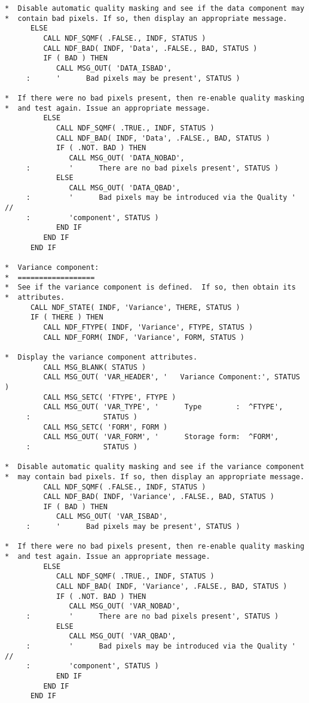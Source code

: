 \documentclass[twoside,11pt]{article}
\begin{document}
\begin{verbatim}
*  Disable automatic quality masking and see if the data component may
*  contain bad pixels. If so, then display an appropriate message.
      ELSE
         CALL NDF_SQMF( .FALSE., INDF, STATUS )
         CALL NDF_BAD( INDF, 'Data', .FALSE., BAD, STATUS )
         IF ( BAD ) THEN
            CALL MSG_OUT( 'DATA_ISBAD',
     :      '      Bad pixels may be present', STATUS )

*  If there were no bad pixels present, then re-enable quality masking
*  and test again. Issue an appropriate message.
         ELSE
            CALL NDF_SQMF( .TRUE., INDF, STATUS )
            CALL NDF_BAD( INDF, 'Data', .FALSE., BAD, STATUS )
            IF ( .NOT. BAD ) THEN
               CALL MSG_OUT( 'DATA_NOBAD',
     :         '      There are no bad pixels present', STATUS )
            ELSE
               CALL MSG_OUT( 'DATA_QBAD',
     :         '      Bad pixels may be introduced via the Quality ' //
     :         'component', STATUS )
            END IF
         END IF
      END IF

*  Variance component:
*  ==================
*  See if the variance component is defined.  If so, then obtain its
*  attributes.
      CALL NDF_STATE( INDF, 'Variance', THERE, STATUS )
      IF ( THERE ) THEN
         CALL NDF_FTYPE( INDF, 'Variance', FTYPE, STATUS )
         CALL NDF_FORM( INDF, 'Variance', FORM, STATUS )

*  Display the variance component attributes.
         CALL MSG_BLANK( STATUS )
         CALL MSG_OUT( 'VAR_HEADER', '   Variance Component:', STATUS )
         CALL MSG_SETC( 'FTYPE', FTYPE )
         CALL MSG_OUT( 'VAR_TYPE', '      Type        :  ^FTYPE',
     :                 STATUS )
         CALL MSG_SETC( 'FORM', FORM )
         CALL MSG_OUT( 'VAR_FORM', '      Storage form:  ^FORM',
     :                 STATUS )

*  Disable automatic quality masking and see if the variance component
*  may contain bad pixels. If so, then display an appropriate message.
         CALL NDF_SQMF( .FALSE., INDF, STATUS )
         CALL NDF_BAD( INDF, 'Variance', .FALSE., BAD, STATUS )
         IF ( BAD ) THEN
            CALL MSG_OUT( 'VAR_ISBAD',
     :      '      Bad pixels may be present', STATUS )

*  If there were no bad pixels present, then re-enable quality masking
*  and test again. Issue an appropriate message.
         ELSE
            CALL NDF_SQMF( .TRUE., INDF, STATUS )
            CALL NDF_BAD( INDF, 'Variance', .FALSE., BAD, STATUS )
            IF ( .NOT. BAD ) THEN
               CALL MSG_OUT( 'VAR_NOBAD',
     :         '      There are no bad pixels present', STATUS )
            ELSE
               CALL MSG_OUT( 'VAR_QBAD',
     :         '      Bad pixels may be introduced via the Quality ' //
     :         'component', STATUS )
            END IF
         END IF
      END IF


\end{verbatim}
\end{document}
